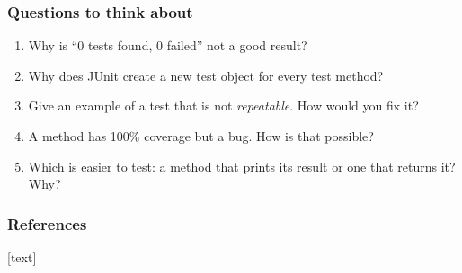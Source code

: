 \documentclass[aspectratio=169,10pt,compress]{beamer}
\begin{document}
\begin{frame}[t,fragile] \frametitle{Questions to think about}
  \begin{enumerate}\small
    \item Why is ``0 tests found, 0 failed'' not a good result?
    \item Why does JUnit create a new test object for every test method?
    \item Give an example of a test that is not \emph{repeatable}. How would you fix it?
    \item A method has 100\% coverage but a bug. How is that possible?
    \item Which is easier to test: a method that prints its result or one that returns it? Why?
  \end{enumerate}
\end{frame}



\begin{frame}[t,allowframebreaks]\frametitle{References}
	[text] %
%	
%	
%	
	
	\tiny %
\end{frame}




\begin{frame}[t,fragile]
	\begin{center}
		\vspace{4cm}
	\end{center}
\end{frame}
\end{document}
